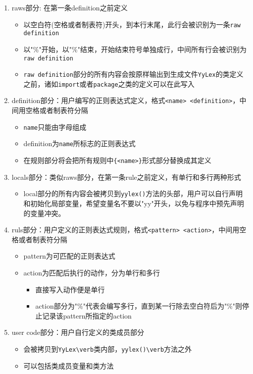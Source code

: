 \documentclass[a4paper]{ctexart} %
\begin{document}
	\begin{enumerate}
		\item raws部分: 在第一条definition之前定义
			\begin{itemize}
				\item 以空白符(空格或者制表符)开头，到本行末尾，此行会被识别为一条\verb|raw definition|
				\item   以"$\%${"开始，以"$\%$}"结束，开始结束符号单独成行，中间所有行会被识别为\verb|raw definition|
				\item \verb|raw definition|部分的所有内容会按原样输出到生成文件\verb|YyLex|的类定义之前，诸如\verb|import|或者\verb|package|之类的定义可以在此写入
			\end{itemize}
		\item definition部分：用户编写的正则表达式定义，格式\verb|<name> <definition>|，中间用空格或者制表符分隔
			\begin{itemize}
				\item \verb|name|只能由字母组成
				\item definition为\verb|name|所标志的正则表达式
				\item 在规则部分将会把所有规则中\verb|{<name>}|形式部分替换成其定义
			\end{itemize}
		\item locals部分：类似raws部分，在第一条rule之前定义，有单行和多行两种形式
			\begin{itemize}
				\item local部分的所有内容会被拷贝到\verb|yylex()|方法的头部，用户可以自行声明和初始化局部变量，希望变量名不要以"yy"开头，以免与程序中预先声明的变量冲突。
			\end{itemize}
		\item ruls部分：用户定义的正则表达式规则，格式\verb|<pattern> <action>|，中间用空格或者制表符分隔
			\begin{itemize}
				\item pattern为可匹配的正则表达式
				\item action为匹配后执行的动作，分为单行和多行
				\begin{itemize}
					\item 直接写入动作便是单行
					\item action部分为"$\%${"代表会编写多行，直到某一行除去空白符后为"$\%$}"则停止记录该pattern所指定的action
				\end{itemize}
			\end{itemize}
		\item user code部分：用户自行定义的类成员部分
			\begin{itemize}
				\item 会被拷贝到\verb|YyLex\verb|类内部，\verb|yylex()\verb|方法之外
				\item 可以包括类成员变量和类方法
			\end{itemize}
	\end{enumerate}
\end{document}
